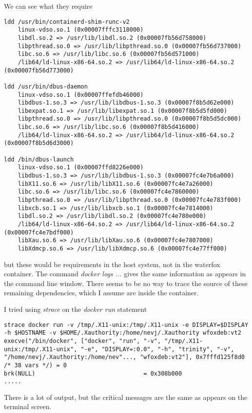 \documentclass[a4paper]{article}  %
\begin{document}
We can see what they require
\begin{tcolorbox}
\begin{verbatim}
ldd /usr/bin/containerd-shim-runc-v2
	linux-vdso.so.1 (0x00007fffc3118000)
	libdl.so.2 => /usr/lib/libdl.so.2 (0x00007fb56d758000)
	libpthread.so.0 => /usr/lib/libpthread.so.0 (0x00007fb56d737000)
	libc.so.6 => /usr/lib/libc.so.6 (0x00007fb56d571000)
	/lib64/ld-linux-x86-64.so.2 => /usr/lib64/ld-linux-x86-64.so.2 (0x00007fb56d773000)

ldd /usr/bin/dbus-daemon
	linux-vdso.so.1 (0x00007ffefdb46000)
	libdbus-1.so.3 => /usr/lib/libdbus-1.so.3 (0x00007f8b5d62e000)
	libexpat.so.1 => /usr/lib/libexpat.so.1 (0x00007f8b5d5fd000)
	libpthread.so.0 => /usr/lib/libpthread.so.0 (0x00007f8b5d5dc000)
	libc.so.6 => /usr/lib/libc.so.6 (0x00007f8b5d416000)
	/lib64/ld-linux-x86-64.so.2 => /usr/lib64/ld-linux-x86-64.so.2 (0x00007f8b5d6d3000)

ldd /bin/dbus-launch
	linux-vdso.so.1 (0x00007ffd8226e000)
	libdbus-1.so.3 => /usr/lib/libdbus-1.so.3 (0x00007fc4e7b6a000)
	libX11.so.6 => /usr/lib/libX11.so.6 (0x00007fc4e7a26000)
	libc.so.6 => /usr/lib/libc.so.6 (0x00007fc4e7860000)
	libpthread.so.0 => /usr/lib/libpthread.so.0 (0x00007fc4e783f000)
	libxcb.so.1 => /usr/lib/libxcb.so.1 (0x00007fc4e7814000)
	libdl.so.2 => /usr/lib/libdl.so.2 (0x00007fc4e780e000)
	/lib64/ld-linux-x86-64.so.2 => /usr/lib64/ld-linux-x86-64.so.2 (0x00007fc4e7bdf000)
	libXau.so.6 => /usr/lib/libXau.so.6 (0x00007fc4e7807000)
	libXdmcp.so.6 => /usr/lib/libXdmcp.so.6 (0x00007fc4e77ff000)

\end{verbatim}
\end{tcolorbox}
but these would be requirements in the host system, not in the waterfox container.
The command {\em docker logs ...} gives the same information as appears in the command line window.  There seems to be no way  to trace the source of these remaining dependencies, which I assume are inside the container.

I tried using {\em strace} on the {\em docker run} statement
\begin{tcolorbox}
\begin{verbatim}
strace docker run -v /tmp/.X11-unix:/tmp/.X11-unix -e DISPLAY=$DISPLAY -h $HOSTNAME -v $HOME/.Xauthority:/home/nevj/.Xauthority wfoxdeb:vt2
execve("/bin/docker", ["docker", "run", "-v", "/tmp/.X11-unix:/tmp/.X11-unix", "-e", "DISPLAY=:0.0", "-h", "trinity", "-v", "/home/nevj/.Xauthority:/home/nev"..., "wfoxdeb:vt2"], 0x7fffd125f8d0 /* 38 vars */) = 0
brk(NULL)                               = 0x308b000
.....
\end{verbatim}
\end{tcolorbox}
There is  a lot of output,  but the critical messages are the same as appears on the terminal screen.
\end{document}

